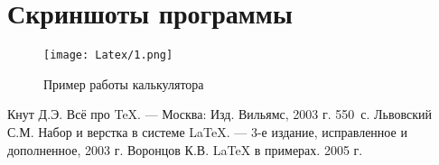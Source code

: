 \documentclass[12pt,a4paper]{scrartcl}
\begin{document}
\section{Скриншоты программы}
\label{sec:picexample}
\begin{figure}[h]
	\texttt{[image: Latex/1.png]}
	\caption{Пример работы калькулятора}\label{fig:par}
\end{figure}

\begin{thebibliography}{9}
Кнут Д.Э. Всё про \TeX. \newblock --- Москва: Изд. Вильямс, 2003 г. 550~с.
Львовский С.М. Набор и верстка в системе \LaTeX{}. \newblock --- 3-е издание, исправленное и дополненное, 2003 г.
Воронцов К.В. \LaTeX{} в примерах. 2005 г.
\end{thebibliography}
\end{document}

